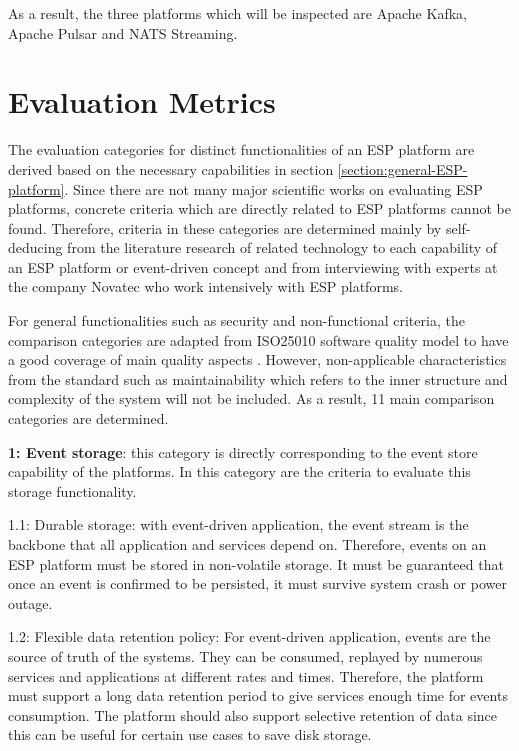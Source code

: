 As a result, the three platforms which will be inspected are Apache Kafka, Apache Pulsar and NATS Streaming.

\section{Evaluation Metrics} \label{section:evaluationcriteria}
The evaluation categories for distinct functionalities of an ESP platform are derived based on the necessary capabilities in section \ref{section:general-ESP-platform}. Since there are not many major scientific works on evaluating ESP platforms, concrete criteria which are directly related to ESP platforms cannot be found. Therefore, criteria in these categories are determined mainly by self-deducing from the literature research of related technology to each capability of an ESP platform or event-driven concept and from interviewing with experts at the company Novatec who work intensively with ESP platforms.

For general functionalities such as security and non-functional criteria, the comparison categories are adapted from ISO25010 software quality model to have a good coverage of main quality aspects \cite{iso25010}. However, non-applicable characteristics from the standard such as maintainability which refers to the inner structure and complexity of the system will not be included. As a result, 11 main comparison categories are determined. 


\textbf{1: Event storage}: this category is directly corresponding to the event store capability of the platforms. In this category are the criteria to evaluate this storage functionality.

1.1: Durable storage: with event-driven application, the event stream is the backbone that all application and services depend on. Therefore, events on an ESP platform must be stored in non-volatile storage. It must be guaranteed that once an event is confirmed to be persisted, it must survive system crash or power outage.

1.2: Flexible data retention policy: For event-driven application, events are the source of truth of the systems. They can be consumed, replayed by numerous services and applications at different rates and times. Therefore, the platform must support a long data retention period to give services enough time for events consumption. The platform should also support selective retention of data since this can be useful for certain use cases to save disk storage.

